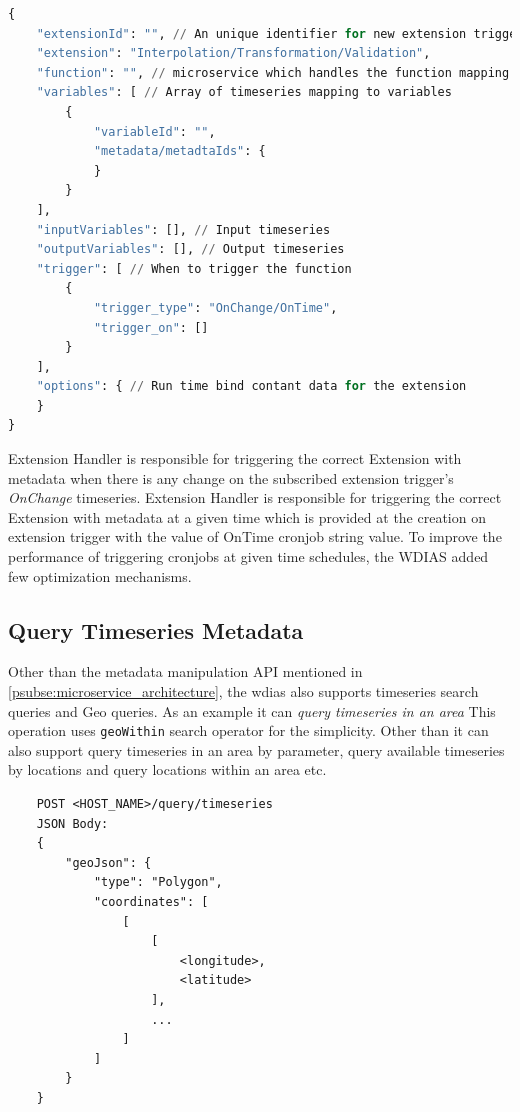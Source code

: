 \documentclass[conference]{IEEEtran}
\begin{document}
\begin{lstlisting}[language=Python]
{
    "extensionId": "", // An unique identifier for new extension trigger
    "extension": "Interpolation/Transformation/Validation",
    "function": "", // microservice which handles the function mapping
    "variables": [ // Array of timeseries mapping to variables
        {
            "variableId": "",
            "metadata/metadtaIds": {
            }
        }
    ],
    "inputVariables": [], // Input timeseries
    "outputVariables": [], // Output timeseries
    "trigger": [ // When to trigger the function
        {
            "trigger_type": "OnChange/OnTime",
            "trigger_on": []
        }
    ],
    "options": { // Run time bind contant data for the extension
    }
}
\end{lstlisting}

Extension Handler is responsible for triggering the correct Extension with metadata when there is any change on the subscribed extension trigger's \emph{OnChange} timeseries.
Extension Handler is responsible for triggering the correct Extension with metadata at a given time which is provided at the creation on extension trigger with the value of OnTime cronjob string value. To improve the performance of triggering cronjobs at given time schedules, the WDIAS added few optimization mechanisms.

\subsection{Query Timeseries Metadata}
\label{psubse:query_timeseries}

Other than the metadata manipulation API mentioned in \cref{psubse:microservice_architecture}, the \acrshort{wdias} also supports timeseries search queries and Geo queries. As an example it can \emph{query timeseries in an area} This operation uses \texttt{geoWithin} search operator for the simplicity. Other than it can also support query timeseries in an area by parameter, query available timeseries by locations and query locations within an area etc.
\begin{lstlisting}
    POST <HOST_NAME>/query/timeseries
    JSON Body:
    {
        "geoJson": {
            "type": "Polygon",
            "coordinates": [
                [
                    [
                        <longitude>,
                        <latitude>
                    ],
                    ...
                ]
            ]
        }
    }
\end{lstlisting}
\end{document}
